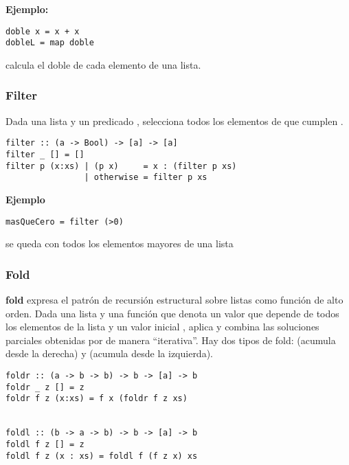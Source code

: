 \textbf{Ejemplo:}
\begin{centrado}
	\begin{verbatim}
doble x = x + x
dobleL = map doble  
	\end{verbatim}
\end{centrado} 

 calcula el doble de cada elemento de una lista.

\subsubsection{Filter}
Dada una lista  y un predicado , selecciona todos los elementos de  que cumplen .

\begin{centrado}
	\begin{verbatim}
filter :: (a -> Bool) -> [a] -> [a]
filter _ [] = []
filter p (x:xs) | (p x)     = x : (filter p xs)
                | otherwise = filter p xs  
	\end{verbatim}
\end{centrado}

\textbf{Ejemplo}
\begin{centrado}
	\begin{verbatim}
masQueCero = filter (>0)
	\end{verbatim}
\end{centrado}

 se queda con todos los elementos mayores de una lista

\subsubsection{Fold}
\textbf{fold} expresa el patrón de recursión estructural sobre listas como función de alto orden. Dada una lista  y una función  que denota un valor que depende de todos los elementos de la lista  y un valor inicial , aplica y combina las soluciones parciales obtenidas por  de manera  ``iterativa''. 
Hay dos tipos de fold:  (acumula desde la derecha) y  (acumula desde la izquierda).

\begin{centrado}
	\begin{verbatim}
foldr :: (a -> b -> b) -> b -> [a] -> b
foldr _ z [] = z
foldr f z (x:xs) = f x (foldr f z xs)
		
		
foldl :: (b -> a -> b) -> b -> [a] -> b
foldl f z [] = z
foldl f z (x : xs) = foldl f (f z x) xs
	\end{verbatim}
\end{centrado}

